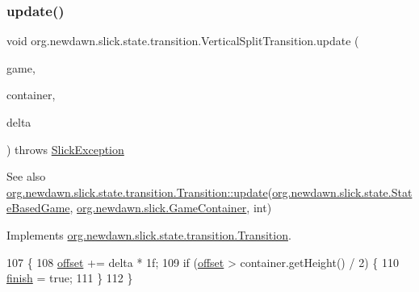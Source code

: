 \subsubsection{\texorpdfstring{update()}{update()}}
{\footnotesize\ttfamily void org.\+newdawn.\+slick.\+state.\+transition.\+Vertical\+Split\+Transition.\+update (\begin{DoxyParamCaption}\item[{\mbox{\hyperlink{classorg_1_1newdawn_1_1slick_1_1state_1_1_state_based_game}{State\+Based\+Game}}}]{game,  }\item[{\mbox{\hyperlink{classorg_1_1newdawn_1_1slick_1_1_game_container}{Game\+Container}}}]{container,  }\item[{int}]{delta }\end{DoxyParamCaption}) throws \mbox{\hyperlink{classorg_1_1newdawn_1_1slick_1_1_slick_exception}{Slick\+Exception}}\hspace{0.3cm}{\ttfamily [inline]}}

\begin{DoxySeeAlso}{See also}
\mbox{\hyperlink{interfaceorg_1_1newdawn_1_1slick_1_1state_1_1transition_1_1_transition_a9be3072f6e2423e3d0a451a419d1d518}{org.\+newdawn.\+slick.\+state.\+transition.\+Transition\+::update}}(\mbox{\hyperlink{classorg_1_1newdawn_1_1slick_1_1state_1_1_state_based_game}{org.\+newdawn.\+slick.\+state.\+State\+Based\+Game}}, \mbox{\hyperlink{classorg_1_1newdawn_1_1slick_1_1_game_container}{org.\+newdawn.\+slick.\+Game\+Container}}, int) 
\end{DoxySeeAlso}


Implements \mbox{\hyperlink{interfaceorg_1_1newdawn_1_1slick_1_1state_1_1transition_1_1_transition_a9be3072f6e2423e3d0a451a419d1d518}{org.\+newdawn.\+slick.\+state.\+transition.\+Transition}}.


\begin{DoxyCode}
107                                   \{
108         \mbox{\hyperlink{classorg_1_1newdawn_1_1slick_1_1state_1_1transition_1_1_vertical_split_transition_aa6cdad04029a3955ec1d84b0a2f06e56}{offset}} += delta * 1f;
109         \textcolor{keywordflow}{if} (\mbox{\hyperlink{classorg_1_1newdawn_1_1slick_1_1state_1_1transition_1_1_vertical_split_transition_aa6cdad04029a3955ec1d84b0a2f06e56}{offset}} > container.getHeight() / 2) \{
110             \mbox{\hyperlink{classorg_1_1newdawn_1_1slick_1_1state_1_1transition_1_1_vertical_split_transition_ade40e19759a22b7b524807868c8992a4}{finish}} = \textcolor{keyword}{true};
111         \}
112     \}
\end{DoxyCode}


